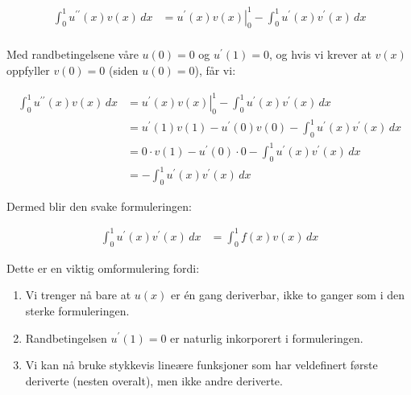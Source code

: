 \documentclass[../main.tex]{subfiles}
\begin{document}
\begin{align*}
    \int_0^1 u^{\prime\prime}(x) v(x) \, dx & = \left. u^{\prime}(x) v(x) \right|_{0}^{1} - \int_0^1 u^{\prime}(x) v^{\prime}(x) \, dx \\
\end{align*}

Med randbetingelsene våre $u(0) = 0$ og $u^{\prime}(1) = 0$, og hvis vi krever at $v(x)$ oppfyller $v(0) = 0$ (siden $u(0) = 0$), får vi:

\begin{align*}
    \int_0^1 u^{\prime\prime}(x) v(x) \, dx & = \left. u^{\prime}(x) v(x) \right|_{0}^{1} - \int_0^1 u^{\prime}(x) v^{\prime}(x) \, dx \\
                                            & = u^{\prime}(1) v(1) - u^{\prime}(0) v(0) - \int_0^1 u^{\prime}(x) v^{\prime}(x) \, dx   \\
                                            & = 0 \cdot v(1) - u^{\prime}(0) \cdot 0 - \int_0^1 u^{\prime}(x) v^{\prime}(x) \, dx      \\
                                            & = - \int_0^1 u^{\prime}(x) v^{\prime}(x) \, dx
\end{align*}

Dermed blir den svake formuleringen:

\begin{align*}
    \int_0^1 u^{\prime}(x) v^{\prime}(x) \, dx & = \int_0^1 f(x) v(x) \, dx
\end{align*}

Dette er en viktig omformulering fordi:

\begin{enumerate}
    \item Vi trenger nå bare at $u(x)$ er én gang deriverbar, ikke to ganger som i den sterke formuleringen.
    \item Randbetingelsen $u^{\prime}(1) = 0$ er naturlig inkorporert i formuleringen.
    \item Vi kan nå bruke stykkevis lineære funksjoner som har veldefinert første deriverte (nesten overalt), men ikke andre deriverte.
\end{enumerate}
\end{document}
